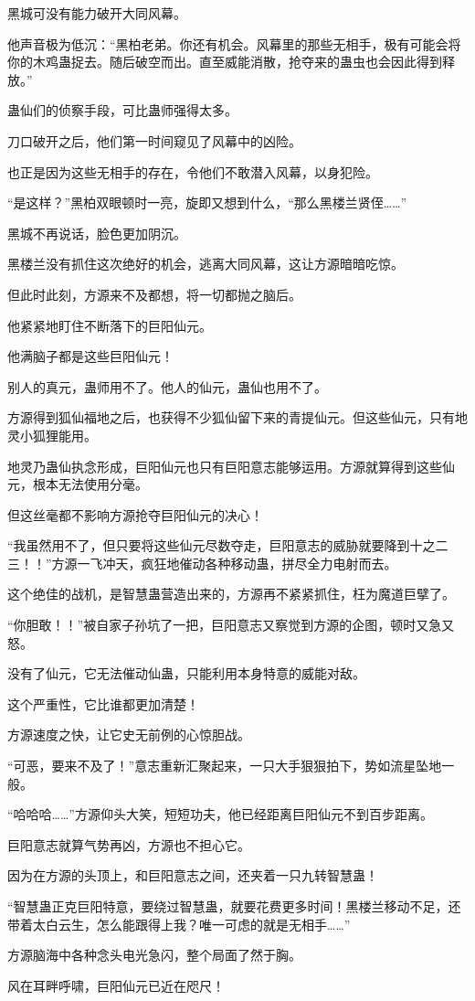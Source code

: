 \begin{this_body}
黑城可没有能力破开大同风幕。

他声音极为低沉：“黑柏老弟。你还有机会。风幕里的那些无相手，极有可能会将你的木鸡蛊捉去。随后破空而出。直至威能消散，抢夺来的蛊虫也会因此得到释放。”

蛊仙们的侦察手段，可比蛊师强得太多。

刀口破开之后，他们第一时间窥见了风幕中的凶险。

也正是因为这些无相手的存在，令他们不敢潜入风幕，以身犯险。

“是这样？”黑柏双眼顿时一亮，旋即又想到什么，“那么黑楼兰贤侄……”

黑城不再说话，脸色更加阴沉。

黑楼兰没有抓住这次绝好的机会，逃离大同风幕，这让方源暗暗吃惊。

但此时此刻，方源来不及都想，将一切都抛之脑后。

他紧紧地盯住不断落下的巨阳仙元。

他满脑子都是这些巨阳仙元！

别人的真元，蛊师用不了。他人的仙元，蛊仙也用不了。

方源得到狐仙福地之后，也获得不少狐仙留下来的青提仙元。但这些仙元，只有地灵小狐狸能用。

地灵乃蛊仙执念形成，巨阳仙元也只有巨阳意志能够运用。方源就算得到这些仙元，根本无法使用分毫。

但这丝毫都不影响方源抢夺巨阳仙元的决心！

“我虽然用不了，但只要将这些仙元尽数夺走，巨阳意志的威胁就要降到十之二三！！”方源一飞冲天，疯狂地催动各种移动蛊，拼尽全力电射而去。

这个绝佳的战机，是智慧蛊营造出来的，方源再不紧紧抓住，枉为魔道巨擘了。

“你胆敢！！”被自家子孙坑了一把，巨阳意志又察觉到方源的企图，顿时又急又怒。

没有了仙元，它无法催动仙蛊，只能利用本身特意的威能对敌。

这个严重性，它比谁都更加清楚！

方源速度之快，让它史无前例的心惊胆战。

“可恶，要来不及了！”意志重新汇聚起来，一只大手狠狠拍下，势如流星坠地一般。

“哈哈哈……”方源仰头大笑，短短功夫，他已经距离巨阳仙元不到百步距离。

巨阳意志就算气势再凶，方源也不担心它。

因为在方源的头顶上，和巨阳意志之间，还夹着一只九转智慧蛊！

“智慧蛊正克巨阳特意，要绕过智慧蛊，就要花费更多时间！黑楼兰移动不足，还带着太白云生，怎么能跟得上我？唯一可虑的就是无相手……”

方源脑海中各种念头电光急闪，整个局面了然于胸。

风在耳畔呼啸，巨阳仙元已近在咫尺！

\end{this_body}

